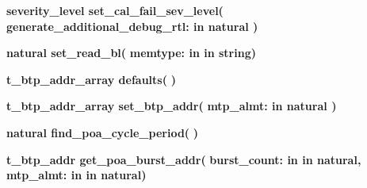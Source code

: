 \begin{DoxyCompactItemize}
\item 
{\bfseries {\bfseries \textcolor{vhdlchar}{severity\+\_\+level}\textcolor{vhdlchar}{ }}} {\bf set\+\_\+cal\+\_\+fail\+\_\+sev\+\_\+level}{\bfseries  ( }{\bfseries \textcolor{vhdlchar}{generate\+\_\+additional\+\_\+debug\+\_\+rtl\+: }\textcolor{stringliteral}{in }{\bfseries \textcolor{comment}{natural}\textcolor{vhdlchar}{ }}}{\bfseries  )} 
\item 
{\bfseries {\bfseries \textcolor{comment}{natural}\textcolor{vhdlchar}{ }}} {\bf set\+\_\+read\+\_\+bl}{\bfseries  ( }{\bfseries \textcolor{vhdlchar}{memtype\+: }\textcolor{stringliteral}{in }\textcolor{vhdlchar}{in string}}{\bfseries  )} 
\item 
{\bfseries {\bfseries {\bfseries {\bf t\+\_\+btp\+\_\+addr\+\_\+array}} \textcolor{vhdlchar}{ }}} {\bf defaults}{\bfseries  ( }{\bfseries  )} 
\item 
{\bfseries {\bfseries {\bfseries {\bf t\+\_\+btp\+\_\+addr\+\_\+array}} \textcolor{vhdlchar}{ }}} {\bf set\+\_\+btp\+\_\+addr}{\bfseries  ( }{\bfseries \textcolor{vhdlchar}{mtp\+\_\+almt\+: }\textcolor{stringliteral}{in }{\bfseries \textcolor{comment}{natural}\textcolor{vhdlchar}{ }}}{\bfseries  )} 
\item 
{\bfseries {\bfseries \textcolor{comment}{natural}\textcolor{vhdlchar}{ }}} {\bf find\+\_\+poa\+\_\+cycle\+\_\+period}{\bfseries  ( }{\bfseries  )} 
\item 
{\bfseries {\bfseries {\bfseries {\bf t\+\_\+btp\+\_\+addr}} \textcolor{vhdlchar}{ }}} {\bf get\+\_\+poa\+\_\+burst\+\_\+addr}{\bfseries  ( }{\bfseries \textcolor{vhdlchar}{burst\+\_\+count\+: }\textcolor{stringliteral}{in }\textcolor{vhdlchar}{in natural}}{\bfseries  , \textcolor{vhdlchar}{mtp\+\_\+almt\+: }\textcolor{stringliteral}{in }\textcolor{vhdlchar}{in natural}}{\bfseries  )} 
\end{DoxyCompactItemize}
